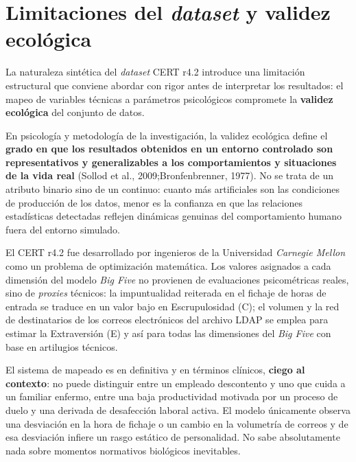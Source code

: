 \documentclass[IB]{TFUOC}%
\begin{document}
\section{Limitaciones del \textit{dataset} y validez ecológica}

La naturaleza sintética del \textit{dataset} CERT r4.2 introduce una limitación 
estructural que conviene abordar con rigor antes de interpretar los resultados: 
el mapeo de variables técnicas a parámetros psicológicos compromete la 
\textbf{validez ecológica} del conjunto de datos.

\medskip
\noindent En psicología y metodología de la investigación, la validez ecológica 
define el \textbf{grado en que los resultados obtenidos en un entorno controlado 
son representativos y generalizables a los comportamientos y situaciones de la 
vida real} (Sollod et al., 2009;Bronfenbrenner, 1977). No se trata de un atributo binario sino de un continuo: cuanto más artificiales son las condiciones de producción de los datos, menor es la confianza en que las relaciones estadísticas detectadas reflejen dinámicas genuinas del comportamiento humano fuera del entorno simulado.

\medskip
\noindent El CERT r4.2 fue desarrollado por ingenieros de la Universidad 
\textit{Carnegie Mellon} como un problema de optimización matemática. Los valores 
asignados a cada dimensión del modelo \textit{Big Five} no provienen de 
evaluaciones psicométricas reales, sino de \textit{proxies} técnicos: la impuntualidad reiterada en el fichaje de horas de entrada se traduce en un valor bajo en Escrupulosidad (C); 
el volumen y la red de destinatarios de los correos electrónicos del archivo 
LDAP se emplea para estimar la Extraversión (E) y así para todas las dimensiones del \textit{Big Five} con base en artilugios técnicos. 

\medskip
\noindent El sistema de mapeado es en definitiva y en términos clínicos, \textbf{ciego al contexto}: no puede distinguir entre un empleado descontento y uno que cuida a un familiar enfermo, entre una baja productividad motivada por un proceso de duelo y una derivada de desafección laboral activa. El modelo únicamente observa una desviación 
en la hora de fichaje o un cambio en la volumetría de correos y de esa 
desviación infiere un rasgo estático de personalidad. No sabe absolutamente nada sobre momentos normativos biológicos inevitables.
\end{document}
